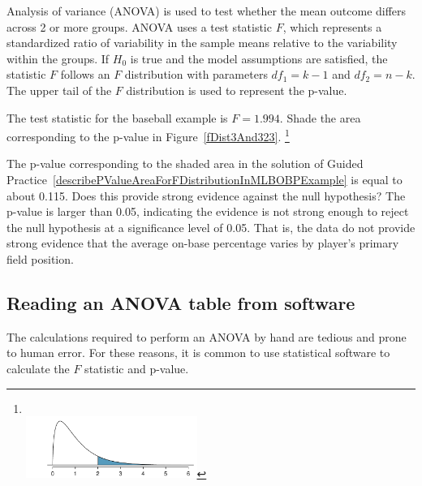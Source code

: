 \begin{termBox}{
Analysis of variance (ANOVA) is used to test whether the mean outcome differs across 2 or more groups. ANOVA uses a test statistic $F$, which represents a standardized ratio of variability in the sample means relative to the variability within the groups. If $H_0$ is true and the model assumptions are satisfied, the statistic $F$ follows an $F$ distribution with parameters $df_{1}=k-1$ and $df_{2}=n-k$. The upper tail of the $F$ distribution is used to represent the p-value.}
\end{termBox}

\begin{exercise}\label{describePValueAreaForFDistributionInMLBOBPExample}
The test statistic for the baseball example is $F=1.994$. Shade the area corresponding to the p-value in Figure~\ref{fDist3And323}. \footnote{\ \vspace{-4mm}\\\includegraphics[height=20mm]{ch_inference_for_means/figures/fDist3And323/fDist3And323Shaded}}
\end{exercise}

\begin{example}{The p-value corresponding to the shaded area in the solution of Guided Practice~\ref{describePValueAreaForFDistributionInMLBOBPExample} is equal to about 0.115. Does this provide strong evidence against the null hypothesis?}
The p-value is larger than 0.05, indicating the evidence is not strong enough to reject the null hypothesis at a significance level of 0.05. That is, the data do not provide strong evidence that the average on-base percentage varies by player's primary field position.
\end{example}


\subsection{Reading an ANOVA table from software}

The calculations required to perform an ANOVA by hand are tedious and prone to human error. For these reasons, it is common to use statistical software to calculate the $F$ statistic and p-value.

